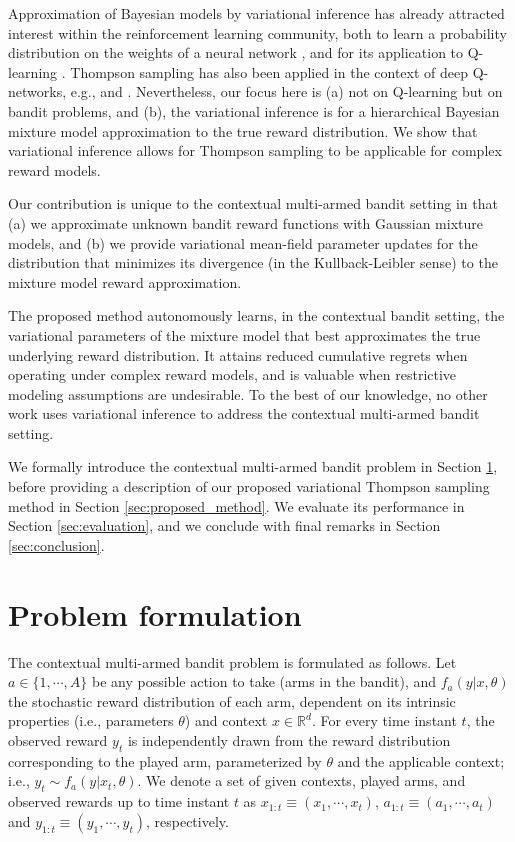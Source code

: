 \documentclass{article}
\def \Real{{\mathbb R}}
\newcommand{\ie}{i.e., }
\newcommand{\eg}{e.g., }
\begin{document}
Approximation of Bayesian models by variational inference has already attracted interest within the reinforcement learning community, both to learn a probability distribution on the weights of a neural network \cite{ip-Blundell2015}, and for its application to Q-learning \cite{j-Lipton2016}. Thompson sampling has also been applied in the context of deep Q-networks, \eg \cite{j-Lipton2016} and \cite{ic-Osband2016}. Nevertheless, our focus here is (a) not on Q-learning but on bandit problems, and (b), the variational inference is for a hierarchical Bayesian mixture model approximation to the true reward distribution. We show that variational inference allows for Thompson sampling to be applicable for complex reward models.

Our contribution is unique to the contextual multi-armed bandit setting in that (a) we approximate unknown bandit reward functions with Gaussian mixture models, and (b) we provide variational mean-field parameter updates for the distribution that minimizes its divergence (in the Kullback-Leibler sense) to the mixture model reward approximation.

The proposed method autonomously learns, in the contextual bandit setting, the variational parameters of the mixture model that best approximates the true underlying reward distribution. It attains reduced cumulative regrets when operating under complex reward models, and is valuable when restrictive modeling assumptions are undesirable. To the best of our knowledge, no other work uses variational inference to address the contextual multi-armed bandit setting. 

We formally introduce the contextual multi-armed bandit problem in Section \ref{sec:problem_formulation}, before providing a description of our proposed variational Thompson sampling method in Section \ref{sec:proposed_method}. We evaluate its performance in Section \ref{sec:evaluation}, and we conclude with final remarks in Section \ref{sec:conclusion}.

\section{Problem formulation}
\label{sec:problem_formulation}

The contextual multi-armed bandit problem is formulated as follows. Let $a\in\{1,\cdots,A\}$ be any possible action to take (arms in the bandit), and $f_{a}(y|x,\theta)$ the stochastic reward distribution of each arm, dependent on its intrinsic properties (\ie parameters $\theta$) and context $x\in\Real^{d}$. For every time instant $t$, the observed reward $y_t$ is independently drawn from the reward distribution corresponding to the played arm, parameterized by $\theta$ and the applicable context; \ie $y_t\sim f_{a}(y|x_t,\theta)$. We denote a set of given contexts, played arms, and observed rewards up to time instant $t$ as $x_{1:t} \equiv (x_1, \cdots , x_t)$, $a_{1:t} \equiv (a_1, \cdots , a_t)$ and $y_{1:t} \equiv (y_1, \cdots , y_t)$, respectively.
\end{document}
